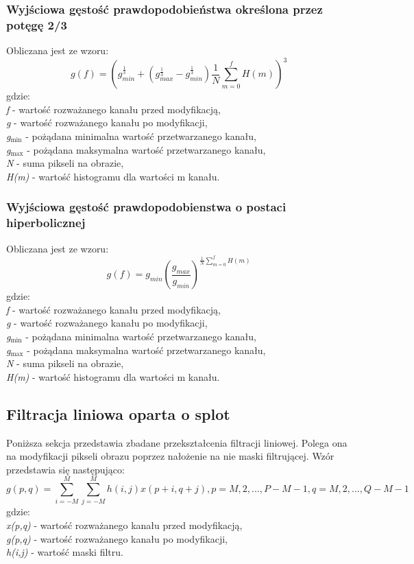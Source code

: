 \documentclass{classrep}
\begin{document}
\subsubsection{Wyjściowa gęstość prawdopodobieństwa określona przez potęgę 2/3}
Obliczana jest ze wzoru:
\[ g(f) = (g_{min}^\frac{1}{3} + (g_{max}^\frac{1}{3} - g_{min}^\frac{1}{3}) \frac{1}{N} \displaystyle\sum_{m=0}^{f} H(m))^3 \]
gdzie:\\
\textit{f} - wartość rozważanego kanału przed modyfikacją,\\
\textit{g} - wartość rozważanego kanału po modyfikacji,\\
\textit{g$_{\text{min}}$} - pożądana minimalna wartość przetwarzanego kanału,\\
\textit{g$_{\text{max}}$} - pożądana maksymalna wartość przetwarzanego kanału,\\
\textit{N} - suma pikseli na obrazie,\\
\textit{H(m)} - wartość histogramu dla wartości m kanału.\\

\subsubsection{Wyjściowa gęstość prawdopodobienstwa o postaci hiperbolicznej}
Obliczana jest ze wzoru:
\[ g(f) = g_{min}(\frac{g_{max}}{g_{min}})^{\frac{1}{N} \displaystyle\sum_{m=0}^{f} H(m)} \]
gdzie:\\
\textit{f} - wartość rozważanego kanału przed modyfikacją,\\
\textit{g} - wartość rozważanego kanału po modyfikacji,\\
\textit{g$_{\text{min}}$} - pożądana minimalna wartość przetwarzanego kanału,\\
\textit{g$_{\text{max}}$} - pożądana maksymalna wartość przetwarzanego kanału,\\
\textit{N} - suma pikseli na obrazie,\\
\textit{H(m)} - wartość histogramu dla wartości m kanału.\\

\subsection{Filtracja liniowa oparta o splot}
Poniższa sekcja przedstawia zbadane przekształcenia filtracji liniowej. Polega ona na modyfikacji pikseli obrazu poprzez nałożenie na nie maski filtrującej. Wzór przedstawia się następująco: 
\[ g(p,q) = \displaystyle\sum_{i=-M}^{M}\displaystyle\sum_{j=-M}^{M} h(i,j)x(p+i,q+j), p = M,2,...,P-M-1, q = M,2,...,Q-M-1 \]
gdzie:\\
\textit{x(p,q)} - wartość rozważanego kanału przed modyfikacją,\\
\textit{g(p,q)} - wartość rozważanego kanału po modyfikacji,\\
\textit{h(i,j)} - wartość maski filtru.\\
\end{document}
